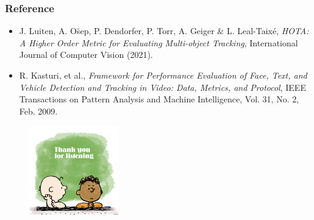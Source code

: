 \documentclass[slidetop, mathserif, dvipsnames]{beamer}
\begin{document}
\begin{frame}
	\frametitle{Reference}

	\scriptsize

	\begin{minipage}{190pt}
	\begin{itemize}
	\item {\sf J. Luiten, A. O\u{s}ep, P. Dendorfer, P. Torr, A. Geiger \& L. Leal-Taix\'e},
		\emph{HOTA: A Higher Order Metric for Evaluating Multi-object Tracking}, International Journal of Computer Vision (2021).
	\item {\sf R. Kasturi, et al.},
		\emph{Framework for Performance Evaluation of Face, Text, and Vehicle Detection and Tracking in Video:
		Data, Metrics, and Protocol}, IEEE Transactions on Pattern Analysis and Machine Intelligence,
		Vol. 31, No. 2, Feb. 2009.
	\end{itemize}
	\end{minipage}
	\begin{minipage}{110pt}
		\begin{figure}
			\includegraphics[width=110pt]{pics/thank_you.png}
		\end{figure}
	\end{minipage}

\end{frame}
\end{document}
